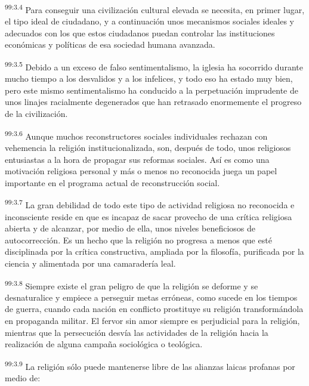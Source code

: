 \documentclass[twoside, 11pt]{book}
\begin{document}
\par
\textsuperscript{99:3.4} Para conseguir una civilización cultural elevada se necesita, en primer lugar, el tipo ideal de ciudadano, y a continuación unos mecanismos sociales ideales y adecuados con los que estos ciudadanos puedan controlar las instituciones económicas y políticas de esa sociedad humana avanzada.

\par
\textsuperscript{99:3.5} Debido a un exceso de falso sentimentalismo, la iglesia ha socorrido durante mucho tiempo a los desvalidos y a los infelices, y todo eso ha estado muy bien, pero este mismo sentimentalismo ha conducido a la perpetuación imprudente de unos linajes racialmente degenerados que han retrasado enormemente el progreso de la civilización.

\par
\textsuperscript{99:3.6} Aunque muchos reconstructores sociales individuales rechazan con vehemencia la religión institucionalizada, son, después de todo, unos religiosos entusiastas a la hora de propagar sus reformas sociales. Así es como una motivación religiosa personal y más o menos no reconocida juega un papel importante en el programa actual de reconstrucción social.

\par
\textsuperscript{99:3.7} La gran debilidad de todo este tipo de actividad religiosa no reconocida e inconsciente reside en que es incapaz de sacar provecho de una crítica religiosa abierta y de alcanzar, por medio de ella, unos niveles beneficiosos de autocorrección. Es un hecho que la religión no progresa a menos que esté disciplinada por la crítica constructiva, ampliada por la filosofía, purificada por la ciencia y alimentada por una camaradería leal.

\par
\textsuperscript{99:3.8} Siempre existe el gran peligro de que la religión se deforme y se desnaturalice y empiece a perseguir metas erróneas, como sucede en los tiempos de guerra, cuando cada nación en conflicto prostituye su religión transformándola en propaganda militar. El fervor sin amor siempre es perjudicial para la religión, mientras que la persecución desvía las actividades de la religión hacia la realización de alguna campaña sociológica o teológica.

\par
\textsuperscript{99:3.9} La religión sólo puede mantenerse libre de las alianzas laicas profanas por medio de:
\end{document}
